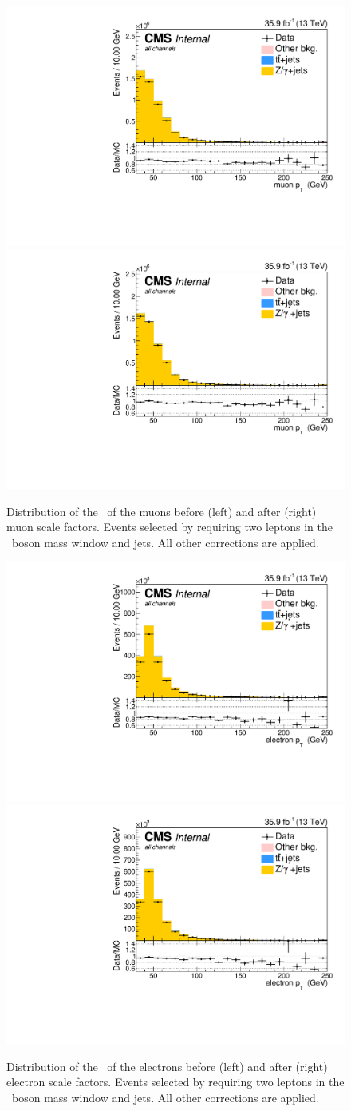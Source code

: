 \begin{figure}[htbp]
	\centering
	\includegraphics[width=0.49\linewidth]{5_Eventselection/Figures/Reweighing/2lepcontrol_dilep_MuPtbefore_all_Stack} %
	\includegraphics[width=0.49\linewidth]{5_Eventselection/Figures/Reweighing/2lepcontrol_dilep_MuPt_all_Stack}%
	\caption{Distribution of the \pt\ of the muons before (left) and after (right) muon scale factors.  Events selected by requiring two leptons in the \PZ\ boson mass window and jets. All other corrections are applied.}
	\label{fig:muSF}
\end{figure}
\begin{figure}[htbp]
	\centering
	\includegraphics[width=0.49\linewidth]{5_Eventselection/Figures/Reweighing/2lepcontrol_dilep_ElPt_all_Stackbefore}
	\includegraphics[width=0.49\linewidth]{5_Eventselection/Figures/Reweighing/2lepcontrol_dilep_ElPt_all_Stack}
	\caption{Distribution of the \pt\ of the electrons before (left) and after (right) electron scale factors.  Events selected by requiring two leptons in the \PZ\ boson mass window and jets. All other corrections are applied.}
	\label{fig:elSF}
\end{figure}

